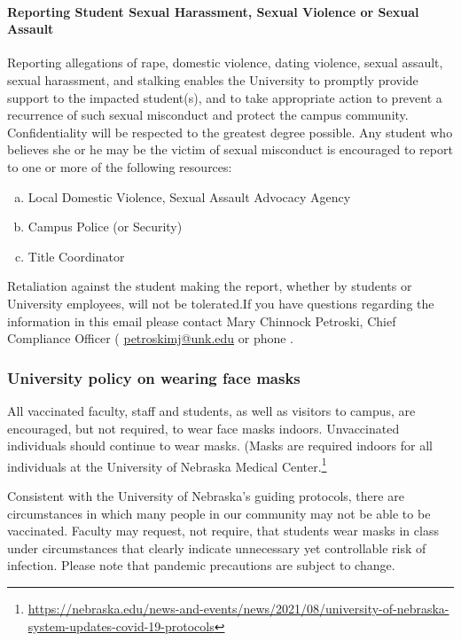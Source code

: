 \documentclass[12pt]{article}
\newcounter{ex}\setcounter{ex}{0}
\newenvironment{alphalist}{
  \begin{enumerate}[(a)]
    \addtolength{\itemsep}{-0.5\itemsep}}
  {\end{enumerate}}
\newcommand{\RomanNumeralCaps}[1]
      {\MakeUppercase{\romannumeral #1}}
\begin{document}
\paragraph{Reporting Student Sexual Harassment, Sexual Violence or Sexual Assault} Reporting allegations of rape, domestic violence, dating violence, sexual assault, sexual harassment, and stalking enables the University to promptly provide support to the impacted student(s), and to take appropriate action to prevent a recurrence of such sexual misconduct and protect the campus community. Confidentiality will be respected to the greatest degree possible. Any student who believes she or he may be the victim of sexual misconduct is encouraged to report to one or more of the following resources:
\begin{alphalist}
\item Local Domestic Violence, Sexual Assault Advocacy Agency 

\item Campus Police (or Security) 

\item Title \RomanNumeralCaps{9} Coordinator 

\end{alphalist}
Retaliation against the student making the report, whether by students or University employees, will not be tolerated.If you have questions regarding the information in this email please 
contact Mary Chinnock Petroski, Chief Compliance Officer (
   \href{mailto:petroskimj@unk.edu}{petroskimj@unk.edu} 
    or phone .

\subsubsection*{University policy on wearing face masks}    
    All vaccinated faculty, staff and students, as well 
    as visitors to campus, are encouraged, but not required, 
    to wear face masks indoors. Unvaccinated individuals 
    should continue to wear masks. (Masks are required indoors for all 
    individuals at the University of Nebraska Medical Center.\footnote{\small
    \url{https://nebraska.edu/news-and-events/news/2021/08/university-of-nebraska-system-updates-covid-19-protocols}}

 

    Consistent with the University of Nebraska’s guiding protocols, there 
    are circumstances in which many people in our community may not be able to 
    be vaccinated. Faculty may request, not require, that students wear masks in 
    class under circumstances that clearly indicate unnecessary yet controllable 
    risk of infection.  Please note that pandemic precautions are subject to change.
\end{document}
